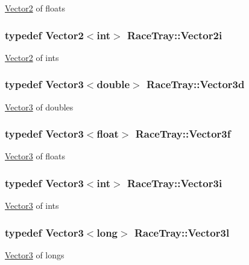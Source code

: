\hyperlink{class_race_tray_1_1_vector2}{Vector2} of floats \hypertarget{group___math_gad3de4c43503d95985d8e4fcbf1a8bc16}{
\subsubsection[{Vector2i}]{\setlength{\rightskip}{0pt plus 5cm}typedef Vector2$<$int$>$ {\bf Race\-Tray\-::\-Vector2i}}}\label{group___math_gad3de4c43503d95985d8e4fcbf1a8bc16}
\hyperlink{class_race_tray_1_1_vector2}{Vector2} of ints \hypertarget{group___math_ga3cf322716609965f0debf240c4eb8ab6}{
\subsubsection[{Vector3d}]{\setlength{\rightskip}{0pt plus 5cm}typedef Vector3$<$double$>$ {\bf Race\-Tray\-::\-Vector3d}}}\label{group___math_ga3cf322716609965f0debf240c4eb8ab6}
\hyperlink{class_race_tray_1_1_vector3}{Vector3} of doubles \hypertarget{group___math_gadb6fa781064c3c3c9b13eb984adae162}{
\subsubsection[{Vector3f}]{\setlength{\rightskip}{0pt plus 5cm}typedef Vector3$<$float$>$ {\bf Race\-Tray\-::\-Vector3f}}}\label{group___math_gadb6fa781064c3c3c9b13eb984adae162}
\hyperlink{class_race_tray_1_1_vector3}{Vector3} of floats \hypertarget{group___math_ga732981bed6c760c8857decb1e04b2118}{
\subsubsection[{Vector3i}]{\setlength{\rightskip}{0pt plus 5cm}typedef Vector3$<$int$>$ {\bf Race\-Tray\-::\-Vector3i}}}\label{group___math_ga732981bed6c760c8857decb1e04b2118}
\hyperlink{class_race_tray_1_1_vector3}{Vector3} of ints \hypertarget{group___math_ga7d214bec28c2592b61b69cbf169d45cf}{
\subsubsection[{Vector3l}]{\setlength{\rightskip}{0pt plus 5cm}typedef Vector3$<$long$>$ {\bf Race\-Tray\-::\-Vector3l}}}\label{group___math_ga7d214bec28c2592b61b69cbf169d45cf}
\hyperlink{class_race_tray_1_1_vector3}{Vector3} of longs 

